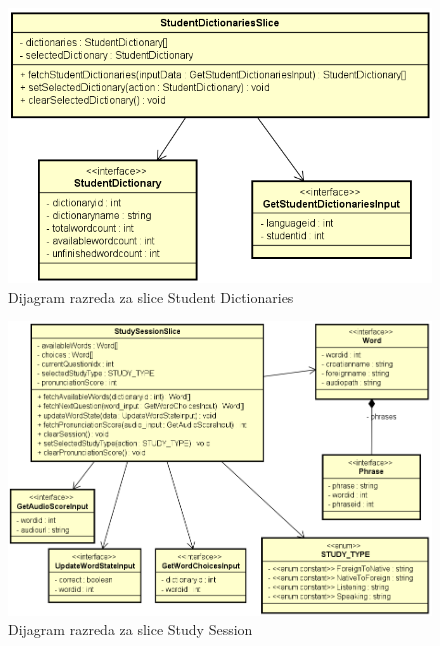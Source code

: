 \begin{figure}[htp]
	\includegraphics[scale=0.6]{dijagrami/StudentDictionariesSlice.png}
	\centering
	\caption{Dijagram razreda za slice Student Dictionaries}
	\label{fig:cls-student-dict}
\end{figure}

\begin{figure}[p!]
	\includegraphics[scale=0.5]{dijagrami/StudySessionSlice.png}
	\centering
	\caption{Dijagram razreda za slice Study Session}
	\label{fig:cls-study-sesion}
\end{figure}

